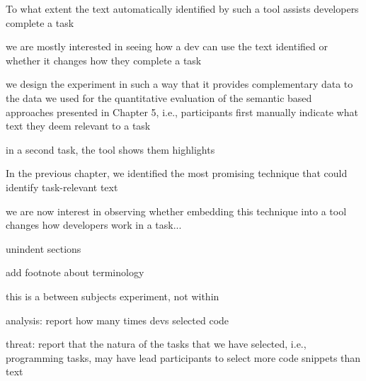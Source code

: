 















\clearpage



To what extent the text automatically identified by such a tool assists developers complete a task


we are mostly interested in seeing how a dev can use the text identified or whether it changes how they complete a task



we design the experiment in such a way that it provides complementary data to the data we used for the quantitative evaluation 
of the semantic based approaches presented in Chapter 5, i.e., participants first manually indicate what text they deem relevant to a task

in a second task, the tool shows them highlights



In the previous chapter, we identified the most promising technique that could identify task-relevant text 


we are now interest in observing whether embedding this technique into a tool changes how developers work in a task...



unindent sections


add footnote about terminology


this is a between subjects experiment, not within 



analysis: report how many times devs selected code

threat: report that the natura of the tasks that we have selected, i.e., programming tasks, may have lead participants to select more code snippets than text

